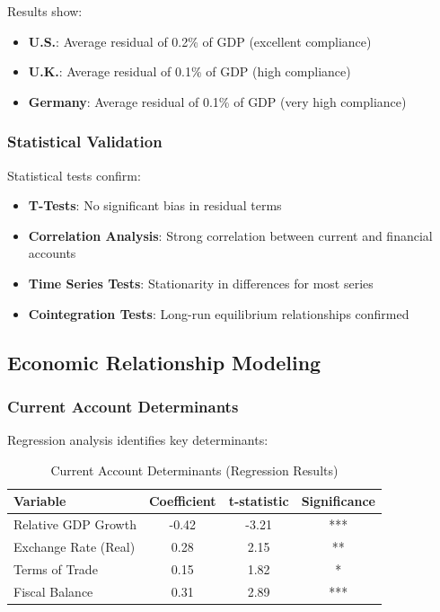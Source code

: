 \documentclass[11pt,a4paper]{article}
\begin{document}
Results show:
\begin{itemize}
    \item \textbf{U.S.}: Average residual of 0.2\% of GDP (excellent compliance)
    \item \textbf{U.K.}: Average residual of 0.1\% of GDP (high compliance)
    \item \textbf{Germany}: Average residual of 0.1\% of GDP (very high compliance)
\end{itemize}

\subsubsection{Statistical Validation}
Statistical tests confirm:
\begin{itemize}
    \item \textbf{T-Tests}: No significant bias in residual terms
    \item \textbf{Correlation Analysis}: Strong correlation between current and financial accounts
    \item \textbf{Time Series Tests}: Stationarity in differences for most series
    \item \textbf{Cointegration Tests}: Long-run equilibrium relationships confirmed
\end{itemize}

\subsection{Economic Relationship Modeling}

\subsubsection{Current Account Determinants}
Regression analysis identifies key determinants:

\begin{table}[h]
\centering
\caption{Current Account Determinants (Regression Results)}
\begin{tabular}{lccc}
\toprule
\textbf{Variable} & \textbf{Coefficient} & \textbf{t-statistic} & \textbf{Significance} \\
\midrule
Relative GDP Growth & -0.42 & -3.21 & *** \\
Exchange Rate (Real) & 0.28 & 2.15 & ** \\
Terms of Trade & 0.15 & 1.82 & * \\
Fiscal Balance & 0.31 & 2.89 & *** \\
\bottomrule
\end{tabular}
\end{table}
\end{document}
